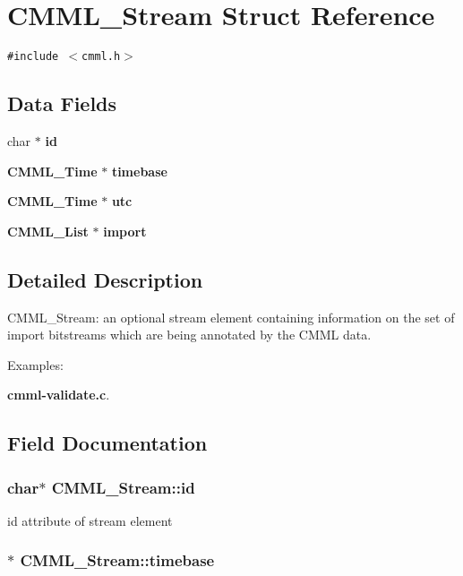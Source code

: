\section{CMML\_\-Stream Struct Reference}
\label{structCMML__Stream}
{\tt \#include $<$cmml.h$>$}

\subsection*{Data Fields}
\begin{CompactItemize}
\item 
char $\ast$ {\bf id}
\item 
{\bf CMML\_\-Time} $\ast$ {\bf timebase}
\item 
{\bf CMML\_\-Time} $\ast$ {\bf utc}
\item 
{\bf CMML\_\-List} $\ast$ {\bf import}
\end{CompactItemize}


\subsection{Detailed Description}
CMML\_\-Stream: an optional stream element containing information on the set of import bitstreams which are being annotated by the CMML data. \begin{Desc}
\item[Examples: ]\par


{\bf cmml-validate.c}.\end{Desc}




\subsection{Field Documentation}
\subsubsection{\setlength{\rightskip}{0pt plus 5cm}char$\ast$ {\bf CMML\_\-Stream::id}}\label{structCMML__Stream_o0}


id attribute of stream element 
\subsubsection{$\ast$ {\bf CMML\_\-Stream::timebase}}\label{structCMML__Stream_o1}


